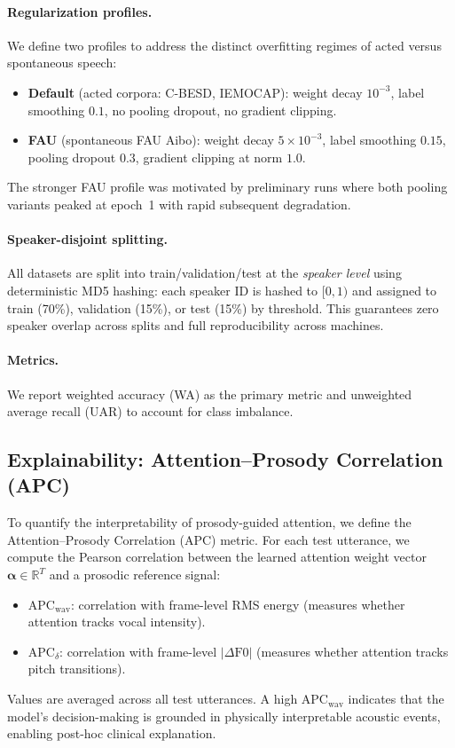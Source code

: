 \paragraph{Regularization profiles.}
We define two profiles to address the distinct overfitting regimes of acted versus spontaneous speech:
\begin{itemize}
\item \textbf{Default} (acted corpora: C-BESD, IEMOCAP): weight decay $10^{-3}$, label smoothing $0.1$, no pooling dropout, no gradient clipping.
\item \textbf{FAU} (spontaneous FAU Aibo): weight decay $5 \times 10^{-3}$, label smoothing $0.15$, pooling dropout $0.3$, gradient clipping at norm $1.0$.
\end{itemize}
The stronger FAU profile was motivated by preliminary runs where both pooling variants peaked at epoch~1 with rapid subsequent degradation.

\paragraph{Speaker-disjoint splitting.}
All datasets are split into train/validation/test at the \textit{speaker level} using deterministic MD5 hashing: each speaker ID is hashed to $[0, 1)$ and assigned to train (70\%), validation (15\%), or test (15\%) by threshold.
This guarantees zero speaker overlap across splits and full reproducibility across machines.

\paragraph{Metrics.}
We report weighted accuracy (WA) as the primary metric and unweighted average recall (UAR) to account for class imbalance.

\subsection{Explainability: Attention--Prosody Correlation (APC)}
\label{ssec:apc}

To quantify the interpretability of prosody-guided attention, we define the Attention--Prosody Correlation (APC) metric.
For each test utterance, we compute the Pearson correlation between the learned attention weight vector $\boldsymbol{\alpha} \in \mathbb{R}^T$ and a prosodic reference signal:
\begin{itemize}
\item $\text{APC}_{\text{wav}}$: correlation with frame-level RMS energy (measures whether attention tracks vocal intensity).
\item $\text{APC}_{\delta}$: correlation with frame-level $|\Delta\text{F0}|$ (measures whether attention tracks pitch transitions).
\end{itemize}
Values are averaged across all test utterances.
A high $\text{APC}_{\text{wav}}$ indicates that the model's decision-making is grounded in physically interpretable acoustic events, enabling post-hoc clinical explanation.
